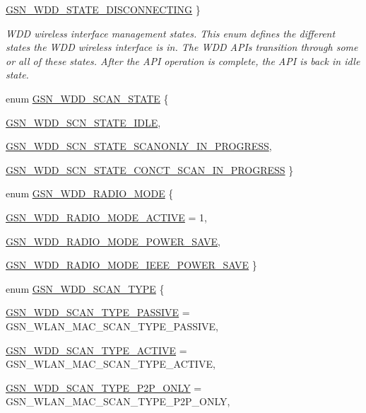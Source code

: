 \begin{DoxyCompactItemize}
\par
\hyperlink{a00677_gga235b17af49bd1a1dc55715a7809b24ffa41f6dfce18e1ef088d7d7bd24c250f97}{GSN\_\-WDD\_\-STATE\_\-DISCONNECTING}
 \}
\begin{DoxyCompactList}\small\item\em WDD wireless interface management states. This enum defines the different states the WDD wireless interface is in. The WDD APIs transition through some or all of these states. After the API operation is complete, the API is back in idle state. \end{DoxyCompactList}\item 
enum \hyperlink{a00603_a7504de238040fb5947d3c3ef6fca9ae9}{GSN\_\-WDD\_\-SCAN\_\-STATE} \{ \par
\hyperlink{a00603_a7504de238040fb5947d3c3ef6fca9ae9a31d25fe118eebeef83abbd1ee1119454}{GSN\_\-WDD\_\-SCN\_\-STATE\_\-IDLE}, 
\par
\hyperlink{a00603_a7504de238040fb5947d3c3ef6fca9ae9ad85a0904d1258338cb21fc74ce280e51}{GSN\_\-WDD\_\-SCN\_\-STATE\_\-SCANONLY\_\-IN\_\-PROGRESS}, 
\par
\hyperlink{a00603_a7504de238040fb5947d3c3ef6fca9ae9aa7ef954c543a9495cabedcff0a5f2480}{GSN\_\-WDD\_\-SCN\_\-STATE\_\-CONCT\_\-SCAN\_\-IN\_\-PROGRESS}
 \}
\item 
enum \hyperlink{a00603_a141edfb4eec2f7e9831a65c822756f64}{GSN\_\-WDD\_\-RADIO\_\-MODE} \{ \par
\hyperlink{a00603_a141edfb4eec2f7e9831a65c822756f64aae25e1907cc4f50dde0cf188d5b0c5e6}{GSN\_\-WDD\_\-RADIO\_\-MODE\_\-ACTIVE} =  1, 
\par
\hyperlink{a00603_a141edfb4eec2f7e9831a65c822756f64ab3858105d04a95098a45840079fd3a7e}{GSN\_\-WDD\_\-RADIO\_\-MODE\_\-POWER\_\-SAVE}, 
\par
\hyperlink{a00603_a141edfb4eec2f7e9831a65c822756f64ac511ce26344d172dd1cd10a3952cc3f4}{GSN\_\-WDD\_\-RADIO\_\-MODE\_\-IEEE\_\-POWER\_\-SAVE}
 \}
\item 
enum \hyperlink{a00603_a8d2389f013d584eba4f8f16644b2e20e}{GSN\_\-WDD\_\-SCAN\_\-TYPE} \{ \par
\hyperlink{a00603_a8d2389f013d584eba4f8f16644b2e20ea77b844153db82d3e5448c20fa3b8aff2}{GSN\_\-WDD\_\-SCAN\_\-TYPE\_\-PASSIVE} =  GSN\_\-WLAN\_\-MAC\_\-SCAN\_\-TYPE\_\-PASSIVE, 
\par
\hyperlink{a00603_a8d2389f013d584eba4f8f16644b2e20ea5e0b88dcc63868c24c041aac726d1cf1}{GSN\_\-WDD\_\-SCAN\_\-TYPE\_\-ACTIVE} =  GSN\_\-WLAN\_\-MAC\_\-SCAN\_\-TYPE\_\-ACTIVE, 
\par
\hyperlink{a00603_a8d2389f013d584eba4f8f16644b2e20ea116d2def36fe2ec219e2eb8cc2a55b8d}{GSN\_\-WDD\_\-SCAN\_\-TYPE\_\-P2P\_\-ONLY} =  GSN\_\-WLAN\_\-MAC\_\-SCAN\_\-TYPE\_\-P2P\_\-ONLY, 

\end{DoxyCompactItemize}
